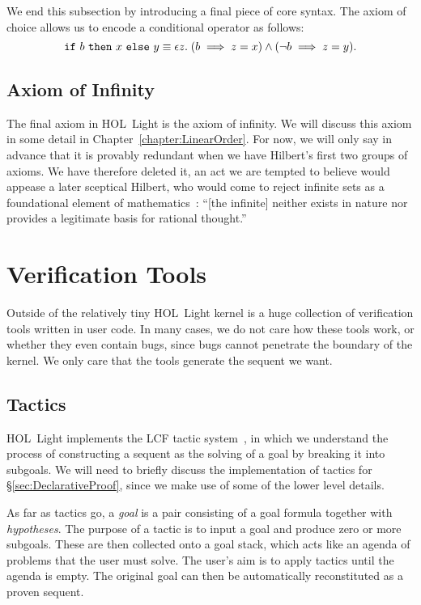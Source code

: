 We end this subsection by introducing a final piece of core syntax. The axiom of choice allows us to encode a conditional operator as follows:
\begin{equation*}
\code{if}\ b\ \code{then}\ x\ \code{else}\ y \equiv \epsilon z.\; (b \implies z = x) \wedge (\neg b \implies z = y) .
\end{equation*}

\subsection{Axiom of Infinity}\label{sec:InfinityDescription}
The final axiom in HOL~Light is the axiom of infinity. We will discuss this axiom in some detail in Chapter~\ref{chapter:LinearOrder}. For now, we will only say in advance that it is provably redundant when we have Hilbert's first two groups of axioms. We have therefore deleted it, an act we are tempted to believe would appease a later sceptical Hilbert, who would come to reject infinite sets as a foundational element of mathematics~\cite{OnInfinite}: ``[the infinite] neither exists in nature nor provides a legitimate basis for rational thought.''

\section{Verification Tools}\label{sec:UserTools}
Outside of the relatively tiny HOL~Light kernel is a huge collection of verification tools written in user code. In many cases, we do not care how these tools work, or whether they even contain bugs, since bugs cannot penetrate the boundary of the kernel. We only care that the tools generate the sequent we want.

\subsection{Tactics}
HOL~Light implements the LCF tactic system~\cite{Tactics}, in which we understand the process of constructing a sequent as the solving of a goal by breaking it into subgoals. We will need to briefly discuss the implementation of tactics for \S\ref{sec:DeclarativeProof}, since we make use of some of the lower level details.

As far as tactics go, a \emph{goal} is a pair consisting of a goal formula together with \emph{hypotheses}. The purpose of a tactic is to input a goal and produce zero or more subgoals. These are then collected onto a goal stack, which acts like an agenda of problems that the user must solve. The user's aim is to apply tactics until the agenda is empty. The original goal can then be automatically reconstituted as a proven sequent.

